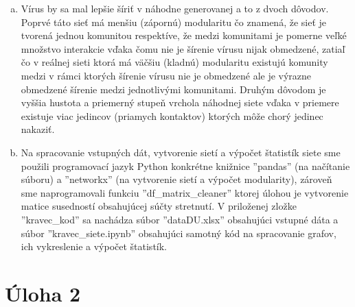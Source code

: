 \documentclass[a4paper]{article}
\begin{document}
\begin{enumerate}[(a)]
	\item 
	Vírus by sa mal lepšie šíriť v náhodne generovanej a to z dvoch dôvodov. Poprvé táto sieť má menšiu (zápornú) modularitu čo znamená, že sieť je tvorená jednou komunitou respektíve, že medzi komunitami je pomerne veľké množstvo interakcie vďaka čomu nie je šírenie vírusu nijak obmedzené, zatiaľ čo v reálnej sieti ktorá má väčšiu (kladnú) modularitu existujú komunity medzi v rámci ktorých šírenie vírusu nie je obmedzené ale je výrazne obmedzené šírenie medzi jednotlivými komunitami. Druhým dôvodom je vyššia hustota a priemerný stupeň vrchola náhodnej siete vďaka v priemere existuje viac jedincov (priamych kontaktov) ktorých môže chorý jedinec nakaziť.
	
	\item 
	Na spracovanie vstupných dát, vytvorenie sietí a výpočet štatistík siete sme použili programovací jazyk Python konkrétne knižnice ''pandas'' (na načítanie súboru) a ''networkx'' (na vytvorenie sietí a výpočet modularity), zároveň sme naprogramovali funkciu ''df\_matrix\_cleaner'' ktorej úlohou je vytvorenie matice susedností obsahujúcej súčty stretnutí. V priloženej zložke ''kravec\_kod'' sa nachádza súbor ''dataDU.xlsx'' obsahujúci vstupné dáta a súbor ''kravec\_siete.ipynb'' obsahujúci samotný kód na spracovanie grafov, ich vykreslenie a výpočet štatistík.

\end{enumerate}

\section{Úloha 2}
\end{document}

